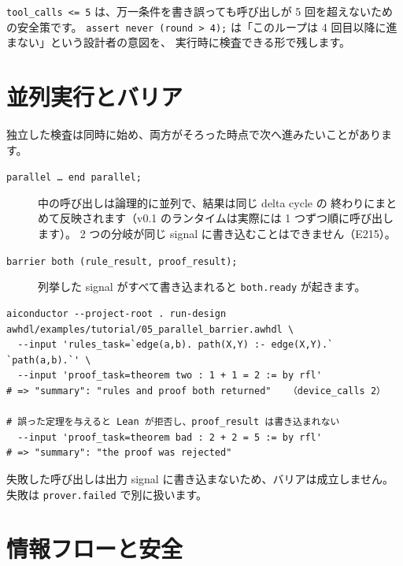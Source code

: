 \documentclass[a4paper,11pt]{ltjsarticle}
\newcommand{\ex}[1]{\texttt{examples/tutorial/#1}}
\begin{document}
\texttt{tool\_calls <= 5} は、万一条件を書き誤っても呼び出しが 5 回を超えないための安全策です。
\texttt{assert never (round > 4);} は「このループは 4 回目以降に進まない」という設計者の意図を、
実行時に検査できる形で残します。

\section{並列実行とバリア}

独立した検査は同時に始め、両方がそろった時点で次へ進みたいことがあります。



\begin{description}
  \item[\texttt{parallel \dots\ end parallel;}] 中の呼び出しは論理的に並列で、結果は同じ delta cycle の
    終わりにまとめて反映されます（v0.1 のランタイムは実際には 1 つずつ順に呼び出します）。
    2 つの分岐が同じ signal に書き込むことはできません（E215）。
  \item[\texttt{barrier both (rule\_result, proof\_result);}] 列挙した signal がすべて書き込まれると
    \texttt{both.ready} が起きます。
\end{description}

\begin{lstlisting}[style=shell]
aiconductor --project-root . run-design awhdl/examples/tutorial/05_parallel_barrier.awhdl \
  --input 'rules_task=`edge(a,b). path(X,Y) :- edge(X,Y).` `path(a,b).`' \
  --input 'proof_task=theorem two : 1 + 1 = 2 := by rfl'
# => "summary": "rules and proof both returned"   （device_calls 2）

# 誤った定理を与えると Lean が拒否し、proof_result は書き込まれない
  --input 'proof_task=theorem bad : 2 + 2 = 5 := by rfl'
# => "summary": "the proof was rejected"
\end{lstlisting}

失敗した呼び出しは出力 signal に書き込まないため、バリアは成立しません。
失敗は \texttt{prover.failed} で別に扱います。

\section{情報フローと安全}\label{sec:flow}
\end{document}

